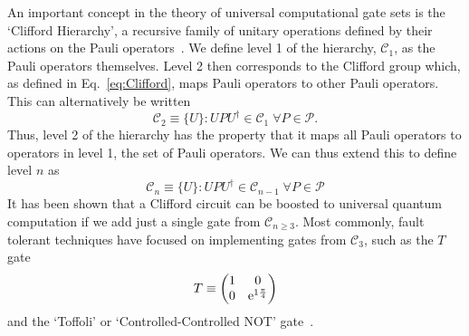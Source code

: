 \documentclass{standalone}
\begin{document}
\par
An important concept in the theory of universal computational gate sets is the `Clifford Hierarchy', a recursive family of unitary operations defined by their actions on the Pauli operators~\cite{Gottesman1999b}. We define level 1 of the hierarchy, $\mathcal{C}_{1}$, as the Pauli operators themselves. Level 2 then corresponds to the Clifford group which, as defined in Eq.~\ref{eq:Clifford}, maps Pauli operators to other Pauli operators. This can alternatively be written
\begin{equation}\label{eq:c2}
\mathcal{C}_{2} \equiv \{U\} : UPU^{\dagger}\in\mathcal{C}_{1}\;\forall P\in\mathcal{P}.
\end{equation}
Thus, level 2 of the hierarchy has the property that it maps all Pauli operators to operators in level 1, the set of Pauli operators. We can thus extend this to define level $n$ as
\begin{equation}\label{eq:heirarchy}
\mathcal{C}_{n}\equiv\{U\} : UPU^{\dagger}\in\mathcal{C}_{n-1}\;\forall P\in\mathcal{P}
\end{equation}
It has been shown that a Clifford circuit can be boosted to universal quantum computation if we add just a single gate from $\mathcal{C}_{n\geq3}$. Most commonly, fault tolerant techniques have focused on implementing gates from $\mathcal{C}_{3}$, such as the $T$ gate 
\[T\equiv\begin{pmatrix}1&0\\0&\mathrm{e}^{1\frac{\pi}{4}}\end{pmatrix}\]
and the `Toffoli' or `Controlled-Controlled NOT' gate~\cite{Shor1997,Gottesman1999b}. 
\end{document}
